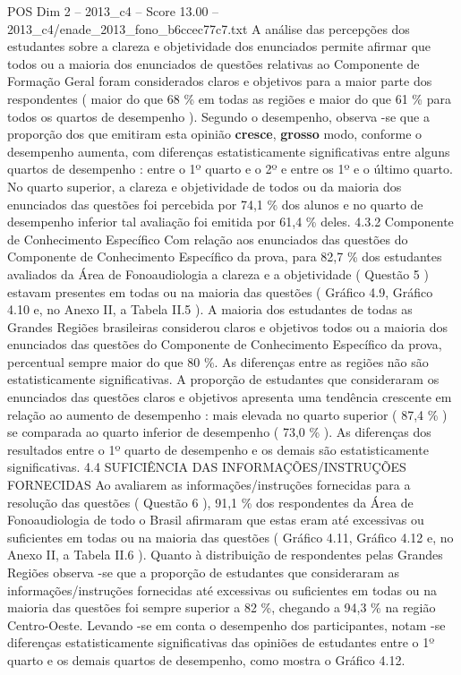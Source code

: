 \begin{textsample}{POS Dim 2 – 2013\_c4 – Score 13.00 – 2013\_c4/enade\_2013\_fono\_b6ccec77c7.txt}
A análise das percepções dos estudantes sobre a clareza e objetividade dos enunciados permite afirmar que todos ou a maioria dos enunciados de questões relativas ao Componente de Formação Geral foram considerados claros e objetivos para a maior parte dos respondentes ( maior do que 68 \% em todas as regiões e maior do que 61 \% para todos os quartos de desempenho ).
Segundo o desempenho, observa -se que a proporção dos que emitiram esta opinião \textbf{cresce}, \textbf{grosso} modo, conforme o desempenho aumenta, com diferenças estatisticamente significativas entre alguns quartos de desempenho : entre o 1º quarto e o 2º e entre os 1º e o último quarto.
No quarto superior, a clareza e objetividade de todos ou da maioria dos enunciados das questões foi percebida por 74,1 \% dos alunos e no quarto de desempenho inferior tal avaliação foi emitida por 61,4 \% deles. 4.3.2 Componente de Conhecimento Específico Com relação aos enunciados das questões do Componente de Conhecimento Específico da prova, para 82,7 \% dos estudantes avaliados da Área de Fonoaudiologia a clareza e a objetividade ( Questão 5 ) estavam presentes em todas ou na maioria das questões ( Gráfico 4.9, Gráfico 4.10 e, no Anexo II, a Tabela II.5 ).
A maioria dos estudantes de todas as Grandes Regiões brasileiras considerou claros e objetivos todos ou a maioria dos enunciados das questões do Componente de Conhecimento Específico da prova, percentual sempre maior do que 80 \%.
As diferenças entre as regiões não são estatisticamente significativas.
A proporção de estudantes que consideraram os enunciados das questões claros e objetivos apresenta uma tendência crescente em relação ao aumento de desempenho : mais elevada no quarto superior ( 87,4 \% ) se comparada ao quarto inferior de desempenho ( 73,0 \% ).
As diferenças dos resultados entre o 1º quarto de desempenho e os demais são estatisticamente significativas. 4.4 SUFICIÊNCIA DAS INFORMAÇÕES/INSTRUÇÕES FORNECIDAS Ao avaliarem as informações/instruções fornecidas para a resolução das questões ( Questão 6 ), 91,1 \% dos respondentes da Área de Fonoaudiologia de todo o Brasil afirmaram que estas eram até excessivas ou suficientes em todas ou na maioria das questões ( Gráfico 4.11, Gráfico 4.12 e, no Anexo II, a Tabela II.6 ).
Quanto à distribuição de respondentes pelas Grandes Regiões observa -se que a proporção de estudantes que consideraram as informações/instruções fornecidas até excessivas ou suficientes em todas ou na maioria das questões foi sempre superior a 82 \%, chegando a 94,3 \% na região Centro-Oeste.
Levando -se em conta o desempenho dos participantes, notam -se diferenças estatisticamente significativas das opiniões de estudantes entre o 1º quarto e os demais quartos de desempenho, como mostra o Gráfico 4.12.

\end{textsample}

